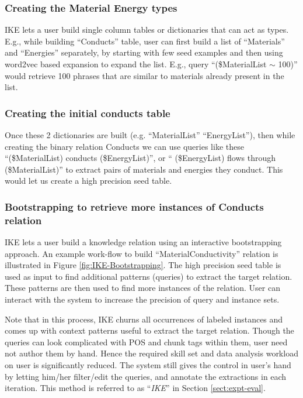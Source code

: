 \documentclass[11pt,letterpaper]{article}
\begin{document}
\subsubsection{Creating the Material Energy types}
IKE lets a user build single column tables or dictionaries that can act as types. E.g., while building ``Conducts'' table, user can first build a list of ``Materials'' and ``Energies'' separately, by starting with few seed examples and then using word2vec based expansion to expand the list. 
E.g., query ``(\$MaterialList $\sim$ 100)'' would retrieve 100 phrases that are similar to materials already present in the list.

\subsubsection{Creating the initial conducts table}
Once these 2 dictionaries are built (e.g. ``MaterialList'' ``EnergyList''), then while creating the binary relation Conducts we can use queries like these ``(\$MaterialList) conducts (\$EnergyList)'', or `` (\$EnergyList) flows through (\$MaterialList)'' to extract pairs of materials and energies they conduct. This would let us create a high precision seed table.

\subsubsection{Bootstrapping to retrieve more instances of Conducts relation}
IKE lets a user build a knowledge relation using an interactive bootstrapping approach. An example work-flow to build ``MaterialConductivity'' relation is illustrated in Figure \ref{fig:IKE-Bootstrapping}. The high precision seed table is used as input to find additional patterns (queries) to extract the target relation. These patterns are then used to find  more instances of the relation. User can interact with the system to increase the precision of query and instance sets.

Note that in this process, IKE churns all occurrences of labeled instances and comes up with context patterns useful to extract the target relation. Though the queries can look complicated with POS and chunk tags within them, user need not author them by hand. Hence the required skill set and data analysis workload on user is significantly reduced.
The system still gives the control in user's hand by letting him/her filter/edit the queries, and annotate the extractions in each iteration. This method is referred to as ``\emph{IKE}'' in  Section \ref{sect:expt-eval}. 
\end{document}
